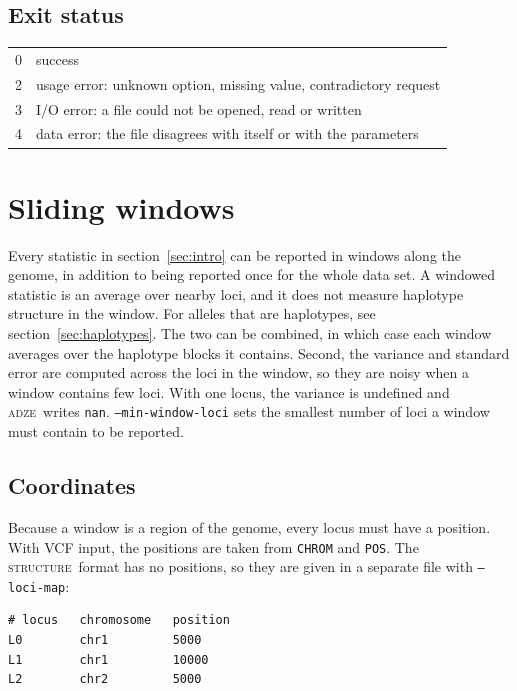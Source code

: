 \documentclass[11pt]{article}
\newcommand{\prog}{\textsc{adze}}
\newcommand{\structureprog}{\textsc{structure}}
\newcommand{\flag}[1]{\texttt{#1}}
\begin{document}
\subsection{Exit status}

\begin{tabular}{ll}
\toprule
0 & success \\
2 & usage error: unknown option, missing value, contradictory request \\
3 & I/O error: a file could not be opened, read or written \\
4 & data error: the file disagrees with itself or with the parameters \\
\bottomrule
\end{tabular}

\section{Sliding windows}
\label{sec:windows}

Every statistic in section~\ref{sec:intro} can be reported in windows along
the genome, in addition to being reported once for the whole data set. A windowed statistic
is an average over nearby loci, and it does not measure haplotype structure in
the window. For alleles that are haplotypes, see
section~\ref{sec:haplotypes}. The two can be combined, in which case each
window averages over the haplotype blocks it contains. Second, the variance and
standard error are computed across the loci in the window, so they are noisy
when a window contains few loci. With one locus, the variance is undefined and
\prog\ writes \texttt{nan}. \flag{--min-window-loci} sets the smallest number
of loci a window must contain to be reported.

\subsection{Coordinates}

Because a window is a region of the genome, every locus must have a position.
With VCF input, the positions are taken from \texttt{CHROM} and \texttt{POS}.
The \structureprog\ format has no positions, so they are given in a separate
file with \flag{--loci-map}:

\begin{Verbatim}[frame=single,fontsize=\small]
# locus   chromosome   position
L0        chr1         5000
L1        chr1         10000
L2        chr2         5000
\end{Verbatim}
\end{document}
